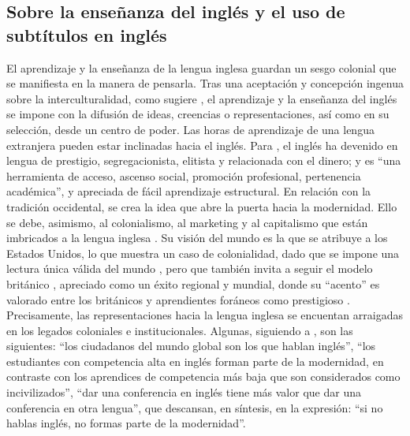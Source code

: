 \documentclass[spanish]{textolivre}
\begin{document}
\subsection{Sobre la enseñanza del inglés y el uso de subtítulos en inglés}
El aprendizaje y la enseñanza de la lengua inglesa guardan un sesgo colonial que se manifiesta en la manera de pensarla. Tras una aceptación y concepción ingenua sobre la interculturalidad, como sugiere \textcite{baum2019decir}, el aprendizaje y la enseñanza del inglés se impone con la difusión de ideas, creencias o representaciones, así como en su selección, desde un centro de poder. Las horas de aprendizaje de una lengua extranjera pueden estar inclinadas hacia el inglés. Para \textcite[p. 5]{baum2019decir}, el inglés ha devenido en lengua de prestigio, segregacionista, elitista y relacionada con el dinero; y es “una herramienta de acceso, ascenso social, promoción profesional, pertenencia académica”, y apreciada de fácil aprendizaje estructural. En relación con la tradición occidental, se crea la idea que abre la puerta hacia la modernidad. Ello se debe, asimismo, al colonialismo, al marketing y al capitalismo que están imbricados a la lengua inglesa \cite{baum2019decir}.  Su visión del mundo es la que se atribuye a los Estados Unidos, lo que muestra un caso de colonialidad, dado que se impone una lectura única válida del mundo \cite{despagne_difficulties_2010}, pero que también invita a seguir el modelo británico \cite{cardenas_cornelio_actitudes_2022}, apreciado como un éxito regional y mundial, donde su “acento” es valorado entre los británicos y aprendientes foráneos como prestigioso \cite{agha_social_2003}. Precisamente, las representaciones hacia la lengua inglesa se encuentan arraigadas en los legados coloniales \cite{despagne_modernidad_2016} e institucionales. Algunas, siguiendo a \textcite{despagne_modernidad_2016}, son las siguientes: “los ciudadanos del mundo global son los que hablan inglés”, “los estudiantes con competencia alta en inglés forman parte de la modernidad, en contraste con los aprendices de competencia más baja que son considerados como incivilizados”, “dar una conferencia en inglés tiene más valor que dar una conferencia en otra lengua”, que descansan, en síntesis, en la expresión: “si no hablas inglés, no formas parte de la modernidad”. 
\end{document}
